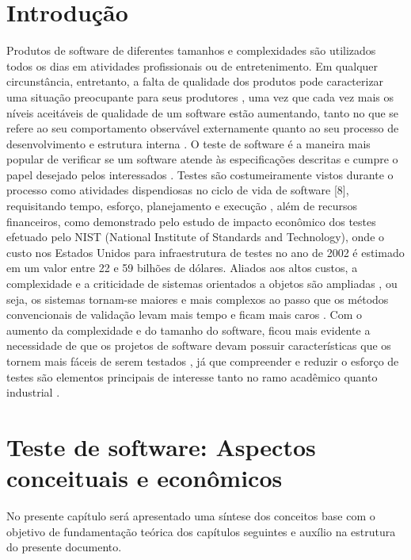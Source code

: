 \documentclass[
	12pt,				%
	oneside,			%
	a4paper,			%
	english,			%
	brazil				%
	]{abntex2ppgsi}
\begin{document}
\chapter{Introdução}
Produtos de software de diferentes tamanhos e complexidades são utilizados todos os dias em atividades profissionais ou de entretenimento. Em qualquer circunstância, entretanto, a falta de qualidade dos produtos pode caracterizar uma situação preocupante para seus produtores \cite{hilburn2002software}  \cite{binder1994test}, uma vez que cada vez mais os níveis aceitáveis de qualidade de um software estão aumentando, tanto no que se refere ao seu comportamento observável externamente quanto ao seu processo de desenvolvimento e estrutura interna \cite{linda2006quality} \cite{bashir2008test} \cite{graham2008foundations}.
O teste de software \cite{tahir2014test} é a maneira mais popular de verificar se um software atende às especificações descritas e cumpre o papel desejado pelos interessados \cite{sommerville2008engenharia}. Testes são costumeiramente vistos durante o processo como atividades dispendiosas no ciclo de vida de software [8], requisitando tempo, esforço, planejamento e execução \cite{tahir2014test}, além de recursos financeiros, como demonstrado pelo estudo de impacto econômico dos testes efetuado pelo NIST (National Institute of Standards and Technology), onde o custo nos Estados Unidos para infraestrutura de testes no ano de 2002 é estimado em um valor entre 22 e 59 bilhões de dólares. Aliados aos altos custos, a complexidade e a criticidade de sistemas orientados a objetos são ampliadas \cite{binder1994test}, ou seja, os sistemas tornam-se maiores e mais complexos ao passo que os métodos convencionais de validação levam mais tempo e ficam mais caros \cite{tahir2014test} \cite{binder1994test}. 
Com o aumento da complexidade e do tamanho do software, ficou mais evidente a necessidade de que os projetos de software devam possuir características que os tornem mais fáceis de serem testados \cite{sheppard2011test}, já que compreender e reduzir o esforço de testes são elementos principais de interesse tanto no ramo acadêmico quanto industrial \cite{tahir2014test}.

\chapter{Teste de software: Aspectos conceituais e econômicos}
No presente capítulo será apresentado uma síntese dos conceitos base com o objetivo de fundamentação teórica dos capítulos seguintes e auxílio na estrutura do presente documento.
\end{document}
